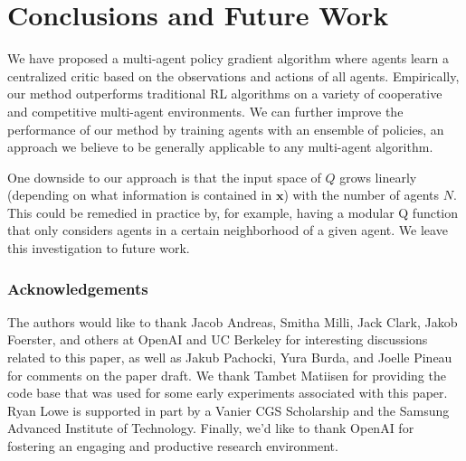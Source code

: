 \documentclass{article}
\begin{document}
\section{Conclusions and Future Work}

We have proposed a multi-agent policy gradient algorithm where agents learn a centralized critic based on the observations and actions of all agents. Empirically, our method outperforms traditional RL algorithms on a variety of cooperative and competitive multi-agent environments. We can further improve the performance of our method by training agents with an ensemble of policies, an approach we believe to be generally applicable to any multi-agent algorithm.

One downside to our approach is that the input space of $Q$ grows linearly (depending on what information is contained in $\mathbf{x}$) with the number of agents $N$. This could be remedied in practice by, for example, having a modular Q function that only considers agents in a certain neighborhood of a given agent. We leave this investigation to future work. 



\subsubsection*{Acknowledgements}

The authors would like to thank Jacob Andreas, Smitha Milli, Jack Clark, Jakob Foerster, and others at OpenAI and UC Berkeley for interesting discussions related to this paper, as well as Jakub Pachocki, Yura Burda, and Joelle Pineau for comments on the paper draft. We thank Tambet Matiisen for providing the code base that was used for some early experiments associated with this paper. Ryan Lowe is supported in part by a Vanier CGS Scholarship and the Samsung Advanced Institute of Technology. Finally, we'd like to thank OpenAI for fostering an engaging and productive research environment. 




\end{document}
